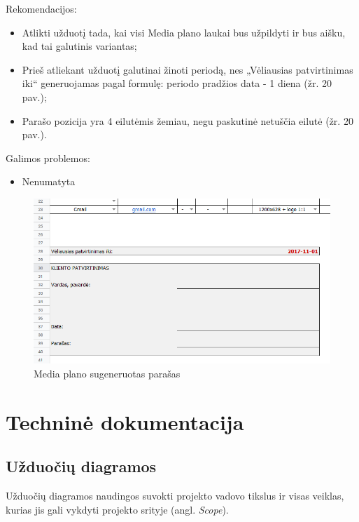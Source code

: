 \bigskip
Rekomendacijos:
\begin{itemize}
    \itemsep0em 
    \item Atlikti užduotį tada, kai visi Media plano laukai bus užpildyti ir bus aišku, kad tai galutinis variantas;
    \item Prieš atliekant užduotį galutinai žinoti periodą, nes „Vėliausias patvirtinimas iki“ generuojamas pagal formulę: periodo pradžios data - 1 diena (žr. 20 pav.);
    \item Parašo pozicija yra 4 eilutėmis žemiau, negu paskutinė netuščia eilutė (žr. 20 pav.).
\end{itemize}

\bigskip
Galimos problemos:
\begin{itemize}
    \itemsep0em 
    \item Nenumatyta
\end{itemize}

\begin{figure}[H]
    \centering
    \includegraphics[scale=0.5]{Images/Screenshots/signature.PNG}
    \caption{Media plano sugeneruotas parašas}
    \label{img:model}
\end{figure}







\pagebreak
\section{Techninė dokumentacija}

\subsection{Užduočių diagramos}
Užduočių diagramos naudingos suvokti projekto vadovo tikslus ir visas veiklas, kurias jis gali vykdyti projekto srityje (angl. \textit{Scope}).

